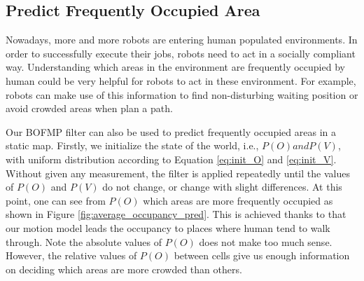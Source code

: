 \subsection{Predict Frequently Occupied Area}
Nowadays, more and more robots are entering human populated environments. In order to successfully execute their jobs, robots need to act in a socially compliant way. Understanding which areas in the environment are frequently occupied by human could be very helpful for robots to act in these environment. For example, robots can make use of this information to find non-disturbing waiting position or avoid crowded areas when plan a path. 

Our BOFMP filter can also be used to predict frequently occupied areas in a static map. Firstly, we initialize the state of the world, i.e., $P(O) and P(V)$, with uniform distribution according to Equation \ref{eq:init_O} and \ref{eq:init_V}. Without given any measurement, the filter is applied repeatedly until the values of $P(O)$ and $P(V)$ do not change, or change with slight differences. At this point, one can see from $P(O)$ which areas are more frequently occupied as shown in Figure \ref{fig:average_occupancy_pred}. This is achieved thanks to that our motion model leads the occupancy to places where human tend to walk through. Note the absolute values of $P(O)$ does not make too much sense. However, the relative values of $P(O)$ between cells give us enough information on deciding which areas are more crowded than others. 

